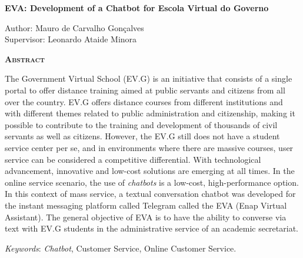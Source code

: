 \begin{center}
	{\Large{\textbf{EVA: Development of a Chatbot for Escola Virtual do Governo}}}
\end{center}

\vspace{1cm}

\begin{flushright}
	Author: Mauro de Carvalho Gonçalves\\
	Supervisor: Leonardo Ataide Minora
\end{flushright}

\vspace{1cm}

\begin{center}
	\Large{\textsc{\textbf{Abstract}}}
\end{center}

\noindent The Government Virtual School (EV.G) is an initiative that consists of a single portal to offer distance training aimed at public servants and citizens from all over the country.
EV.G offers distance courses from different institutions and with different themes related to public administration and citizenship, making it possible to contribute to the training and development of thousands of civil servants as well as citizens.
However, the EV.G still does not have a student service center per se, and in environments where there are massive courses, user service can be considered a competitive differential.
With technological advancement, innovative and low-cost solutions are emerging at all times. In the online service scenario, the use of \textit{chatbots} is a low-cost, high-performance option.
In this context of mass service, a textual conversation chatbot was developed for the instant messaging platform called Telegram called the EVA (Enap Virtual Assistant). The general objective of EVA is to have the ability to converse via text with EV.G students in the administrative service of an academic secretariat.

\noindent\textit{Keywords}: \textit{Chatbot}, Customer Service, Online Customer Service.